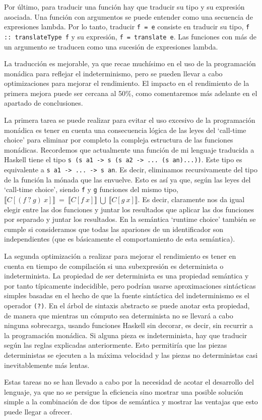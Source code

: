 \documentclass[class=article, crop=false]{standalone}
\begin{document}
Por último, para traducir una función hay que traducir su tipo y su expresión asociada.
Una función con argumentos se puede entender como una secuencia de expresiones lambda. Por
lo tanto, traducir \verb`f = e` consiste en traducir su tipo, \verb`f :: translateType f` y
su expresión, \verb`f = translate e`. Las funciones con más de un argumento se traducen como
una sucesión de expresiones lambda.

La traducción es mejorable, ya que recae muchísimo en el uso de la programación monádica
para reflejar el indeterminismo, pero se pueden llevar a cabo optimizaciones para mejorar
el rendimiento. El impacto en el rendimiento de la primera mejora puede ser cercana al 50\%,
como comentaremos más adelante en el apartado de conclusiones.

La primera tarea se puede realizar para evitar el uso excesivo de la programación monádica
es tener en cuenta una consecuencia lógica de las leyes del `call-time choice' para eliminar
por completo la compleja estructura de las funciones monádicas. Recordemos que actualmente
una función de mi lenguaje traducida a Haskell tiene el tipo
\verb`s (s a1 -> s (s a2 -> ... (s an)...))`. Este tipo es equivalente a
\verb`s a1 -> ... -> s an`. Es decir, eliminamos recursivamente del tipo de la función la
mónada que las envuelve. Esto es así ya que, según las leyes del `call-time choice', siendo
\verb`f` y \verb`g` funciones del mismo tipo, $\llbracket C[(f \: ? \: g) \: x]\rrbracket
\: = \: \llbracket C[f \: x]\rrbracket \: \bigcup \: \llbracket C[g \: x]\rrbracket$. Es
decir, claramente nos da igual elegir entre las dos funciones y juntar los resultados que
aplicar las dos funciones por separado y juntar los resultados. En la semántica
`runtime choice' también se cumple si consideramos que todas las apariones de un
identificador son  independientes (que es básicamente el comportamiento de esta semántica).

La segunda optimización a realizar para mejorar el rendimiento es tener en cuenta en tiempo
de compilación si una subexpresión es determinista o indeterminista. La propiedad de ser
determinista es una propiedad semántica y por tanto típicamente indecidible, pero podrían
usarse aproximaciones sintácticas simples basadas en el hecho de que la fuente sintáctica
del indeterminismo es el operador \verb`(?)`. En el árbol de sintaxis abstracto se puede
anotar esta propiedad, de manera que mientras un cómputo sea determinista no se llevará a
cabo ninguna sobrecarga, usando funciones Haskell sin decorar, es decir, sin recurrir a la
programación monádica. Si alguna pieza es indeterminista, hay que traducir según las reglas
explicadas anteriormente. Esto permitiría que las piezas deterministas se ejecuten a la
máxima velocidad y las piezas no deterministas casi inevitablemente más lentas.

Estas tareas no se han llevado a cabo por la necesidad de acotar el desarrollo del lenguaje,
ya que no se persigue la eficiencia sino mostrar una posible solución simple a la combinación
de dos tipos de semántica y mostrar las ventajas que esto puede llegar a ofrecer.
\end{document}
